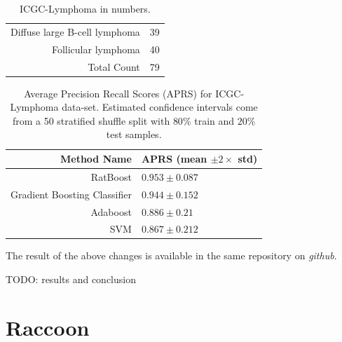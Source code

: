 \begin{table}[!ht]
  \centering
  \begin{tabular}{rc}
    Diffuse large B-cell lymphoma & 39 \\
    Follicular lymphoma & 40 \\
    Total Count & 79 \\
  \end{tabular}
  \caption{ICGC-Lymphoma in numbers.}
  \label{tbl:ratboost2-icgc-lymphoma-dataset}
\end{table}

\begin{table}[!ht]
  \centering
  \begin{tabular}{rl}
    Method Name & APRS (mean $\pm 2 \times$ std) \\ \hline
    RatBoost & $0.953 \pm 0.087$ \\
    Gradient Boosting Classifier & $0.944 \pm 0.152$ \\
    Adaboost & $0.886 \pm 0.21$ \\
    SVM & $0.867 \pm 0.212$ \\ \hline
  \end{tabular}
  \caption{Average Precision Recall Scores (APRS) for ICGC-Lymphoma data-set. Estimated confidence intervals come from a 50 stratified shuffle split with $80\%$ train and $20\%$ test samples.}
  \label{tbl:ratboost2-performance}
\end{table}

The result of the above changes is available in the same repository on \emph{github}.

TODO: results and conclusion

\section{Raccoon}
